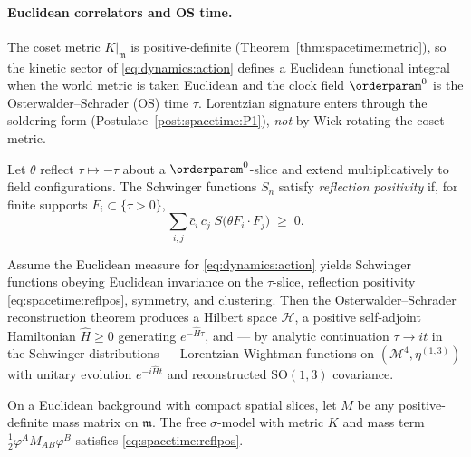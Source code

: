 \paragraph{Euclidean correlators and OS time.}
The coset metric $K|_{\mathfrak{m}}$ is positive-definite
(Theorem~\ref{thm:spacetime:metric}), so the kinetic sector of
\eqref{eq:dynamics:action} defines a Euclidean functional integral when the
world metric is taken Euclidean and the clock field $\orderparam^0$ is the
Osterwalder--Schrader (OS) time $\tau$. Lorentzian signature enters through
the soldering form (Postulate~\ref{post:spacetime:P1}), \emph{not} by Wick
rotating the coset metric.

\begin{definition}
\label{def:spacetime:reflpos}
Let $\theta$ reflect $\tau\mapsto-\tau$ about a $\orderparam^0$-slice and
extend multiplicatively to field configurations. The Schwinger functions
$S_n$ satisfy \emph{reflection positivity} if, for finite supports
$F_i\subset\{\tau>0\}$,
\begin{equation}\label{eq:spacetime:reflpos}
  \sum_{i,j}\bar c_i\,c_j\;
  S\bigl(\theta F_i\cdot F_j\bigr)\;\ge\;0.
\end{equation}
\end{definition}

\begin{theorem}
\label{thm:spacetime:OS}
Assume the Euclidean measure for \eqref{eq:dynamics:action} yields
Schwinger functions obeying Euclidean invariance on the $\tau$-slice,
reflection positivity \eqref{eq:spacetime:reflpos}, symmetry, and
clustering. Then the Osterwalder--Schrader reconstruction theorem
\cite{OsterwalderSchrader1973,OsterwalderSchrader1975} produces a Hilbert
space $\mathcal{H}$, a positive self-adjoint Hamiltonian $\widehat{H}\ge0$
generating $e^{-\widehat H\tau}$, and --- by analytic continuation
$\tau\to it$ in the Schwinger distributions --- Lorentzian Wightman
functions on $(\mathcal{M}^4,\eta^{(1,3)})$ with unitary evolution
$e^{-i\widehat H t}$ and reconstructed $\mathrm{SO}(1,3)$ covariance.
\end{theorem}

\begin{proposition}
\label{prop:spacetime:rp-gaussian}
On a Euclidean background with compact spatial slices, let $M$ be any
positive-definite mass matrix on $\mathfrak{m}$. The free $\sigma$-model
with metric $K$ and mass term $\frac{1}{2}\varphi^A M_{AB}\varphi^B$
satisfies \eqref{eq:spacetime:reflpos}.
\end{proposition}

